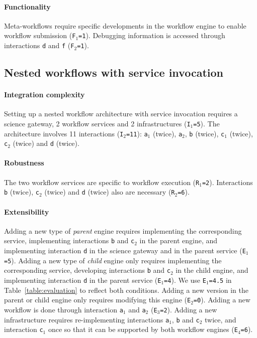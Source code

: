 \documentclass[preprint,3p,twocolumn]{elsarticle}
\newcommand{\correction}[1]{\color{blue}#1\color{black}\xspace}
\begin{document}
\paragraph{\correction{Functionality}} Meta-workflows require specific
developments in the workflow engine to enable workflow submission
(\texttt{\correction{F}$_1$=1}). Debugging information is accessed through
interactions \texttt{d} and \texttt{f} (\texttt{\correction{F}$_2$=1}).

\subsection{Nested workflows with service invocation}

\paragraph{Integration complexity} Setting up a nested workflow
architecture with service invocation requires a science gateway, 2
workflow services and 2 infrastructures (\texttt{I$_1$=5}). The
architecture involves 11 interactions (\texttt{I$_2$=11}):
\texttt{a$_1$} (twice), \texttt{a$_2$}, \texttt{b} (twice), \texttt{c$_1$} (twice),
\texttt{c$_2$} (twice) and
\texttt{d} (twice).

\paragraph{Robustness} The two workflow services are specific to
workflow execution (\texttt{R$_1$=2}). Interactions \texttt{b}
(twice), \texttt{c$_2$} (twice) and \texttt{d} (twice) also
are necessary (\texttt{R$_2$=6}).

\paragraph{Extensibility} Adding a new type of \emph{parent} engine
requires implementing the corresponding service,  implementing
interactions \texttt{b} and \texttt{c$_2$} in the parent engine, and
implementing interaction \texttt{d} in the science gateway and in the
parent service (\texttt{E$_1$=5}). Adding a new type of \emph{child}
engine only requires implementing the corresponding service, 
developing interactions \texttt{b} and \texttt{c$_2$} in the child
engine, and implementing interaction \texttt{d} in the parent service
(\texttt{E$_1$=4}). We use \texttt{E$_1$=4.5} in
Table~\ref{table:evaluation} to reflect both conditions. Adding a new
version in the parent or child engine only requires modifying this
engine (\texttt{E$_2$=0}). Adding a new workflow is done through
interaction \texttt{a$_1$} and \texttt{a$_2$}
(\texttt{E$_3$=2}). Adding a new infrastructure requires 
re-implementing interactions \texttt{a$_1$}, \texttt{b} and
\texttt{c$_2$} twice, and interaction \texttt{c$_1$} once so that it
can be supported by both workflow engines (\texttt{E$_4$=6}).
\end{document}
